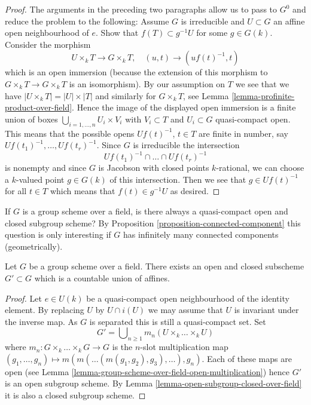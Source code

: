 \begin{proof}
\medskip\noindent
The arguments in the preceding two paragraphs allow us to pass to $G^0$
and reduce the problem to the following:
Assume $G$ is irreducible and $U \subset G$ an affine
open neighbourhood of $e$. Show that $f(T) \subset g^{-1}U$
for some $g \in G(k)$. Consider the morphism
$$
U \times_k T \longrightarrow G \times_k T,\quad
(u, t) \longrightarrow (uf(t)^{-1}, t)
$$
which is an open immersion (because the extension of this morphism to
$G \times_k T \to G \times_k T$ is an isomorphism).
By our assumption on $T$ we see that we have $|U \times_k T| = |U| \times |T|$
and similarly for $G \times_k T$, see
Lemma \ref{lemma-profinite-product-over-field}.
Hence the image of the displayed open immersion is a finite union
of boxes $\bigcup_{i = 1, \ldots, n} U_i \times V_i$ with
$V_i \subset T$ and $U_i \subset G$ quasi-compact open. This means that
the possible opens $Uf(t)^{-1}$, $t \in T$ are finite in number, say
$Uf(t_1)^{-1}, \ldots, Uf(t_r)^{-1}$. Since $G$ is irreducible the
intersection
$$
Uf(t_1)^{-1} \cap \ldots \cap Uf(t_r)^{-1}
$$
is nonempty and since $G$ is Jacobson with closed points $k$-rational,
we can choose a $k$-valued point $g \in G(k)$ of this intersection.
Then we see that $g \in Uf(t)^{-1}$ for all $t \in T$ which
means that $f(t) \in g^{-1}U$ as desired.
\end{proof}

\begin{remark}
\label{remark-easy}
If $G$ is a group scheme over a field, is there always a quasi-compact
open and closed subgroup scheme? By
Proposition \ref{proposition-connected-component}
this question is only interesting if $G$ has infinitely many connected
components (geometrically).
\end{remark}

\begin{lemma}
\label{lemma-group-scheme-field-countable-affine}
Let $G$ be a group scheme over a field.
There exists an open and closed subscheme $G' \subset G$
which is a countable union of affines.
\end{lemma}

\begin{proof}
Let $e \in U(k)$ be a quasi-compact open neighbourhood of the identity
element. By replacing $U$ by $U \cap i(U)$ we may assume that
$U$ is invariant under the inverse map. As $G$ is separated this is
still a quasi-compact set. Set
$$
G' = \bigcup\nolimits_{n \geq 1} m_n(U \times_k \ldots \times_k U)
$$
where $m_n : G \times_k \ldots \times_k G \to G$ is the $n$-slot
multiplication map
$(g_1, \ldots, g_n) \mapsto m(m(\ldots (m(g_1, g_2), g_3), \ldots ), g_n)$.
Each of these maps are open (see
Lemma \ref{lemma-group-scheme-over-field-open-multiplication})
hence $G'$ is an open subgroup scheme. By
Lemma \ref{lemma-open-subgroup-closed-over-field}
it is also a closed subgroup scheme.
\end{proof}






